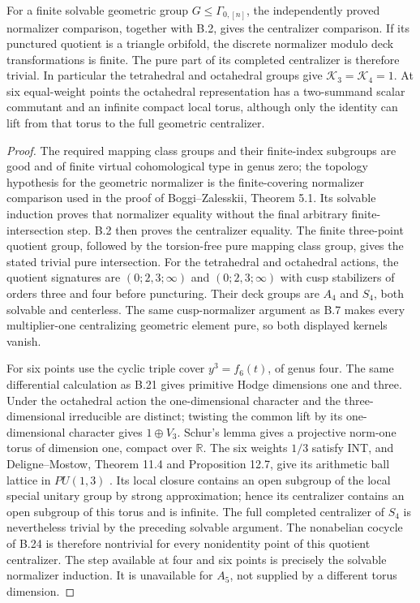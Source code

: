 For a finite solvable geometric group \(G\leq\Gamma_{0,[n]}\),
the independently proved normalizer comparison, together
with B.2, gives the centralizer comparison. If its punctured
quotient is a triangle orbifold, the discrete normalizer
modulo deck transformations is finite. The pure part of
its completed centralizer is therefore trivial. In
particular the tetrahedral and octahedral groups give
\(\mathcal K_3=\mathcal K_4=1\).
At six equal-weight points the octahedral representation
has a two-summand scalar commutant and an infinite compact
local torus, although only the identity can lift from that
torus to the full geometric centralizer.
\begin{proof}
The required mapping class groups and their finite-index
subgroups are good and of finite virtual cohomological type
in genus zero; the topology hypothesis for the geometric
normalizer is the finite-covering normalizer comparison
used in the proof of Boggi--Zalesskii, Theorem 5.1.
Its solvable induction proves that normalizer equality
without the final arbitrary finite-intersection step.
B.2 then proves the centralizer equality. The finite
three-point quotient group, followed by the torsion-free
pure mapping class group, gives the stated trivial pure
intersection. For the tetrahedral and octahedral actions,
the quotient signatures are \((0;2,3;\infty)\) and
\((0;2,3;\infty)\) with cusp stabilizers of orders three
and four before puncturing. Their deck groups are
\(A_4\) and \(S_4\), both solvable and centerless.
The same cusp-normalizer argument as B.7 makes every
multiplier-one centralizing geometric element pure,
so both displayed kernels vanish.

For six points use the cyclic triple cover
\(y^3=f_6(t)\), of genus four. The same differential
calculation as B.21 gives primitive Hodge dimensions
one and three. Under the octahedral action the
one-dimensional character and the three-dimensional
irreducible are distinct; twisting the common lift by
its one-dimensional character gives \(1\oplus V_3\).
Schur's lemma gives a projective norm-one torus of
dimension one, compact over \(\mathbb R\).
The six weights \(1/3\) satisfy INT, and
Deligne--Mostow, Theorem 11.4 and Proposition 12.7,
give its arithmetic ball lattice in \(PU(1,3)\)
\citep{DeligneMostow1986}. Its local closure contains
an open subgroup of the local special unitary group
by strong approximation; hence its centralizer contains
an open subgroup of this torus and is infinite.
The full completed centralizer of \(S_4\) is nevertheless
trivial by the preceding solvable argument. The
nonabelian cocycle of B.24 is therefore nontrivial
for every nonidentity point of this quotient centralizer.
The step available at four and six points is precisely
the solvable normalizer induction. It is unavailable
for \(A_5\), not supplied by a different torus dimension.
\end{proof}

